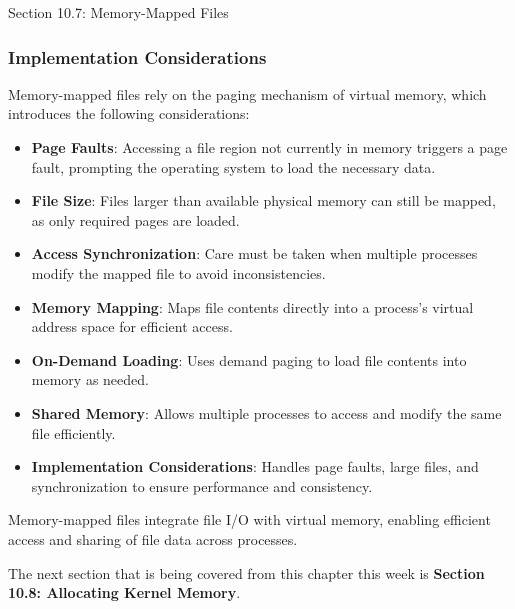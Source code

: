 \begin{notes}{Section 10.7: Memory-Mapped Files}
    \subsubsection*{Implementation Considerations}
    
    Memory-mapped files rely on the paging mechanism of virtual memory, which introduces the following considerations:
    \begin{itemize}
        \item \textbf{Page Faults}: Accessing a file region not currently in memory triggers a page fault, prompting the operating system to load the necessary data.
        \item \textbf{File Size}: Files larger than available physical memory can still be mapped, as only required pages are loaded.
        \item \textbf{Access Synchronization}: Care must be taken when multiple processes modify the mapped file to avoid inconsistencies.
    \end{itemize}
    
    \begin{highlight}
    
        \begin{itemize}
            \item \textbf{Memory Mapping}: Maps file contents directly into a process's virtual address space for efficient access.
            \item \textbf{On-Demand Loading}: Uses demand paging to load file contents into memory as needed.
            \item \textbf{Shared Memory}: Allows multiple processes to access and modify the same file efficiently.
            \item \textbf{Implementation Considerations}: Handles page faults, large files, and synchronization to ensure performance and consistency.
        \end{itemize}
    
    Memory-mapped files integrate file I/O with virtual memory, enabling efficient access and sharing of file data across processes.
    
    \end{highlight}
\end{notes}

The next section that is being covered from this chapter this week is \textbf{Section 10.8: Allocating Kernel Memory}.


